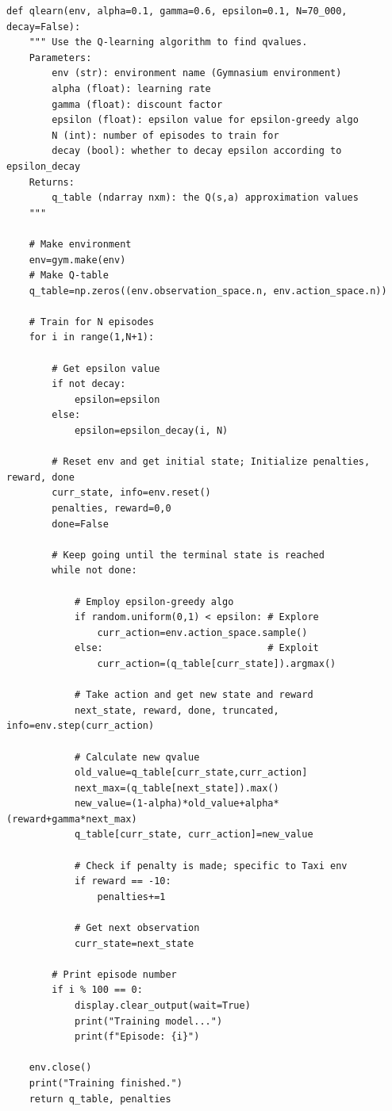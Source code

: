 \begin{lstlisting}
def qlearn(env, alpha=0.1, gamma=0.6, epsilon=0.1, N=70_000, decay=False):
    """ Use the Q-learning algorithm to find qvalues.
    Parameters:
        env (str): environment name (Gymnasium environment)
        alpha (float): learning rate
        gamma (float): discount factor
        epsilon (float): epsilon value for epsilon-greedy algo
        N (int): number of episodes to train for
        decay (bool): whether to decay epsilon according to epsilon_decay
    Returns:
        q_table (ndarray nxm): the Q(s,a) approximation values
    """

    # Make environment
    env=gym.make(env)
    # Make Q-table
    q_table=np.zeros((env.observation_space.n, env.action_space.n))

    # Train for N episodes
    for i in range(1,N+1):

        # Get epsilon value
        if not decay:
            epsilon=epsilon
        else:
            epsilon=epsilon_decay(i, N)

        # Reset env and get initial state; Initialize penalties, reward, done
        curr_state, info=env.reset()
        penalties, reward=0,0
        done=False

        # Keep going until the terminal state is reached
        while not done:

            # Employ epsilon-greedy algo
            if random.uniform(0,1) < epsilon: # Explore
                curr_action=env.action_space.sample()
            else:                             # Exploit
                curr_action=(q_table[curr_state]).argmax()

            # Take action and get new state and reward
            next_state, reward, done, truncated, info=env.step(curr_action)

            # Calculate new qvalue
            old_value=q_table[curr_state,curr_action]
            next_max=(q_table[next_state]).max()
            new_value=(1-alpha)*old_value+alpha*(reward+gamma*next_max)
            q_table[curr_state, curr_action]=new_value

            # Check if penalty is made; specific to Taxi env
            if reward == -10:
                penalties+=1

            # Get next observation
            curr_state=next_state

        # Print episode number
        if i % 100 == 0:
            display.clear_output(wait=True)
            print("Training model...")
            print(f"Episode: {i}")

    env.close()
    print("Training finished.")
    return q_table, penalties
\end{lstlisting}

